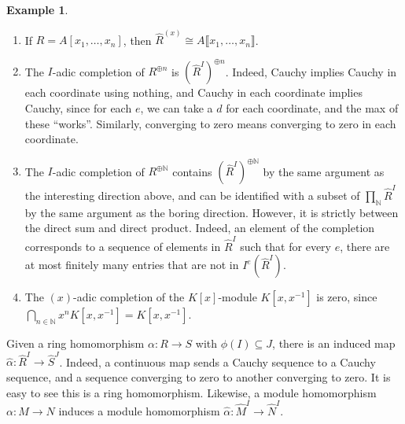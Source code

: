 \documentclass{amsart}[12pt]
\newcommand{\N}{\mathbb{N}}
\numberwithin{equation}{section}
\theoremstyle{plain} %
\theoremstyle{definition}
\newtheorem{ex}[equation]{Example}
\theoremstyle{remark}
\begin{document}
\begin{ex} 
\begin{enumerate}
\item If $R=A[x_1,\dots,x_n]$, then $\hat{R}^{(x)} \cong A\llbracket x_1,\dots, x_n\rrbracket$.
\item The $I$-adic completion of $R^{\oplus n}$ is $(\hat{R}^{I})^{\oplus n}$. Indeed, Cauchy implies Cauchy in each coordinate using nothing, and Cauchy in each coordinate implies Cauchy, since for each $e$, we can take a $d$ for each coordinate, and the max of these ``works''. Similarly, converging to zero means converging to zero in each coordinate.
\item The $I$-adic completion of $R^{\oplus \N}$ contains $(\hat{R}^{I})^{\oplus \N}$ by the same argument as the interesting direction above, and can be identified with a subset of $\prod_{\N} \hat{R}^{I}$ by the same argument as the boring direction. However, it is strictly between the direct sum and direct product. Indeed, an element of the completion corresponds to a sequence of elements in $\hat{R}^{I}$ such that for every $e$, there are at most finitely many entries that are not in $I^e(\hat{R}^{I})$.
\item The $(x)$-adic completion of the $K[x]$-module $K[x,x^{-1}]$ is zero, since $\bigcap_{n\in \N} x^n K[x,x^{-1}] = K[x,x^{-1}]$.
\end{enumerate}
\end{ex} 


Given a ring homomorphism $\alpha: R\to S$ with $\phi(I)\subseteq J$, there is an induced map $\hat{\alpha}: \hat{R}^I \to \hat{S}^J$. Indeed, a continuous map sends a Cauchy sequence to a Cauchy sequence, and a sequence converging to zero to another converging to zero. It is easy to see this is a ring homomorphism. Likewise, a module homomorphism $\alpha: M\to N$ induces a module homomorphism $\hat{\alpha}: \hat{M}^I \to \hat{N}^I$.
\end{document}
